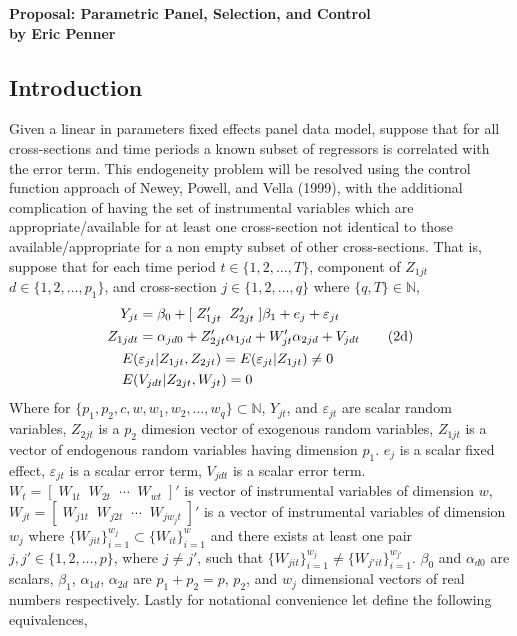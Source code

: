 \documentclass[10pt]{article}
\begin{document}
\doublespacing
\begin{center} 
\Large \bf Proposal: Parametric Panel, Selection, and Control \\
 \large by Eric Penner \rm
\end{center} 


\subsection*{Introduction } 
\noindent Given a linear in parameters fixed effects panel data model, suppose that for all cross-sections and time periods a known subset of regressors is correlated with the error term. This endogeneity problem will be resolved using the control function approach of Newey, Powell, and Vella (1999), with the additional complication of having the set of instrumental variables which are appropriate/available for at least one cross-section  not identical to those available/appropriate for a non empty subset of other cross-sections. That is, suppose that for each time period $t \in \{1,2, \ldots, T\}$, component of $Z_{1jt}$ $ d\in \{1,2, \ldots , p_1\}$, and cross-section $j \in \{1,2,\ldots, q\}$ where $\{q,T\} \in \mathbb{N}$, 
\begin{align} 
Y_{jt} &= \beta_0 + [\; Z_{1jt}' \;\; Z_{2jt}' \;] \beta_1 + e_j + \varepsilon_{jt} \\
%
Z_{1jdt} &= \alpha_{jd0} + Z_{2jt}' \alpha_{1jd} + W_{jt}' \alpha_{2jd} + V_{jdt} \tag{2d} \\
%
\addtocounter {equation} {1}
E(&\varepsilon_{jt} | Z_{1jt} , Z_{2jt}) = E(\varepsilon_{jt} | Z_{1jt}) \neq 0  \\
%
E(& V_{jdt} | Z_{2jt},W_{jt}) = 0 
%
\end{align}
Where for $\{p_1,p_2,c,w,w_1,w_2, \ldots ,w_q \} \subset \mathbb{N}$, $Y_{jt}$, and $\varepsilon_{jt}$ are scalar random variables, $ Z_{2jt}$ is a $p_2$ dimesion vector of exogenous random variables, $Z_{1jt}$  is a vector of endogenous random variables having dimension $p_1$. $e_j$ is a scalar fixed effect, $\varepsilon_{jt}$ is a scalar error term, $V_{jdt}$ is a scalar error term. $W_t = [ \; W_{1t} \;\; W_{2t} \;\; \cdots \;\; W_{wt} \;]'$ is vector of instrumental variables of dimension $w$, $W_{jt} = [\;W_{j1t} \;\; W_{j2t} \;\; \cdots \;\; W_{jw_jt} \;]'$ is a vector of instrumental variables of dimension $w_j$ where $\{W_{jit}\}_{i=1}^{w_j} \subset \{W_{it}\}_{i=1}^{w}$ and there exists at least one pair $j,j'  \in \{1,2, \ldots , p\}$, where $j \neq j'$, such that $\{W_{jit}\}_{i=1}^{w_j} \neq \{W_{j'it}\}_{i=1}^{w_{j'}}$. $\beta_0$ and $\alpha_{d0}$  are scalars, $\beta_1$, $\alpha_{1d}$, $\alpha_{2d}$ are $p_1 +p_2 = p$, $p_2$, and $w_j$ dimensional vectors of real numbers respectively. Lastly for notational convenience let define the following equivalences, 
\end{document}
